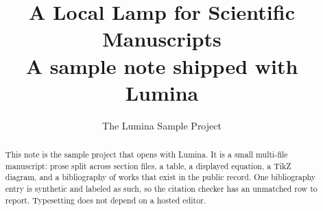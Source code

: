 \documentclass[11pt]{article}
\title{\textcolor{ink}{A Local Lamp for Scientific Manuscripts}\\[0.35em]
\large A sample note shipped with Lumina}
\author{The Lumina Sample Project}
\date{}
\begin{document}
\maketitle

\begin{abstract}
This note is the sample project that opens with Lumina.
It is a small multi-file manuscript: prose split across section files, a table, a displayed equation, a TikZ diagram, and a bibliography of works that exist in the public record.
One bibliography entry is synthetic and labeled as such, so the citation checker has an unmatched row to report.
Typesetting does not depend on a hosted editor.
\end{abstract}







\end{document}
